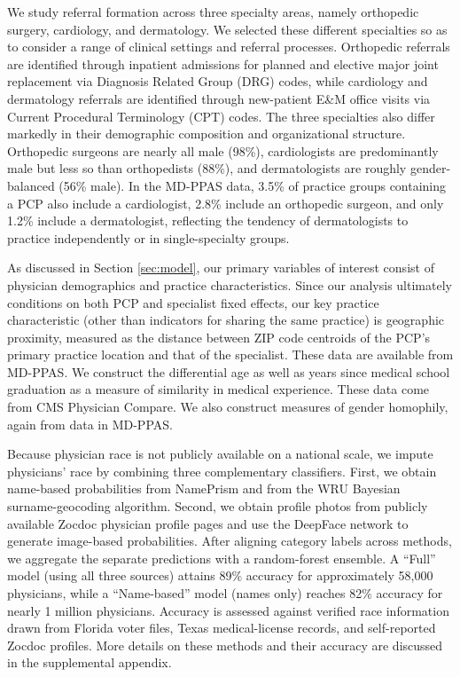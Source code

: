 \documentclass[12pt]{article}
\begin{document}
We study referral formation across three specialty areas, namely orthopedic surgery, cardiology, and dermatology. We selected these different specialties so as to consider a range of clinical settings and referral processes. Orthopedic referrals are identified through inpatient admissions for planned and elective major joint replacement via Diagnosis Related Group (DRG) codes, while cardiology and dermatology referrals are identified through new-patient E\&M office visits via Current Procedural Terminology (CPT) codes. The three specialties also differ markedly in their demographic composition and organizational structure. Orthopedic surgeons are nearly all male (98\%), cardiologists are predominantly male but less so than orthopedists (88\%), and dermatologists are roughly gender-balanced (56\% male). In the MD-PPAS data, 3.5\% of practice groups containing a PCP also include a cardiologist, 2.8\% include an orthopedic surgeon, and only 1.2\% include a dermatologist, reflecting the tendency of dermatologists to practice independently or in single-specialty groups.

As discussed in Section \ref{sec:model}, our primary variables of interest consist of physician demographics and practice characteristics. Since our analysis ultimately conditions on both PCP and specialist fixed effects, our key practice characteristic (other than indicators for sharing the same practice) is geographic proximity, measured as the distance between ZIP code centroids of the PCP's primary practice location and that of the specialist. These data are available from MD-PPAS. We construct the differential age as well as years since medical school graduation as a measure of similarity in medical experience. These data come from CMS Physician Compare. We also construct measures of gender homophily, again from data in MD-PPAS.

Because physician race is not publicly available on a national scale, we impute physicians' race by combining three complementary classifiers. First, we obtain name-based probabilities from NamePrism and from the WRU Bayesian surname-geocoding algorithm. Second, we obtain profile photos from publicly available Zocdoc physician profile pages and use the DeepFace network to generate image-based probabilities. After aligning category labels across methods, we aggregate the separate predictions with a random-forest ensemble. A ``Full'' model (using all three sources) attains 89\% accuracy for approximately 58,000 physicians, while a ``Name-based'' model (names only) reaches 82\% accuracy for nearly 1 million physicians. Accuracy is assessed against verified race information drawn from Florida voter files, Texas medical-license records, and self-reported Zocdoc profiles. More details on these methods and their accuracy are discussed in the supplemental appendix.
\end{document}
